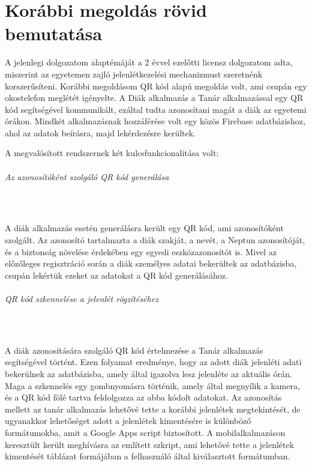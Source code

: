 \chapter{Korábbi megoldás rövid bemutatása} \label{chapter3}

A jelenlegi dolgozatom alaptémáját a 2 évvel ezelőtti licensz dolgozatom adta, miszerint az egyetemen zajló jelenlétkezelési mechanizmust szeretnénk korszerűsíteni. Korábbi megoldásom QR kód alapú megoldás volt, ami csupán egy okostelefon meglétét igényelte.
A Diák alkalmazás a Tanár alkalmazással egy QR kód segítségével kommunikált, ezáltal tudta azonosítani magát a diák az egyetemi órákon. Mindkét alkalmazásnak hozzáférése volt egy közös Firebase adatbázishoz, ahol az adatok beírásra, majd lekérdezésre kerültek.

A megvalósított rendszernek két kulcsfunkcionalitása volt:

\subparagraph* {Az azonosítóként szolgáló QR kód generálása}\
\newline

A diák alkalmazás esetén generálásra került egy QR kód, ami azonosítóként szolgált. Az azonosító tartalmazta a diák szakját, a nevét, a Neptun azonosítóját, és a biztonság növelése érdekében egy egyedi eszközazonosítót is.
Mivel az előzőleges regisztráció során a diák személyes adatai bekerültek az adatbázisba, csupán lekértük ezeket az adatokat a QR kód generálásához.


\subparagraph* {QR kód szkennelése a jelenlét rögzítéséhez}\
\newline

A diák azonosítására szolgáló QR kód értelmezése a Tanár alkalmazás segítségével történt. Ezen folyamat eredménye, hogy az adott diák jelenléti adati bekerülnek az adatbázisba, amely által igazolva lesz jelenléte az aktuális órán. 
Maga a szkennelés egy gombnyomásra történik, amely által megnyílik a kamera, és a QR kód fölé tartva feldolgozza az abba kódolt adatokat.
Az azonosítás mellett az tanár alkalmazás lehetővé tette a korábbi jelenlétek megtekintését, de ugyanakkor lehetőséget adott a jelenlétek kimentésére is különböző formátumokba, amit a Google Apps script biztosított. A mobilalkalmazáson keresztült került meghívásra az említett szkript, ami lehetővé tette a jelenlétek kimentését táblázat formájában a felhasználó által kiválasztott formátumban.

